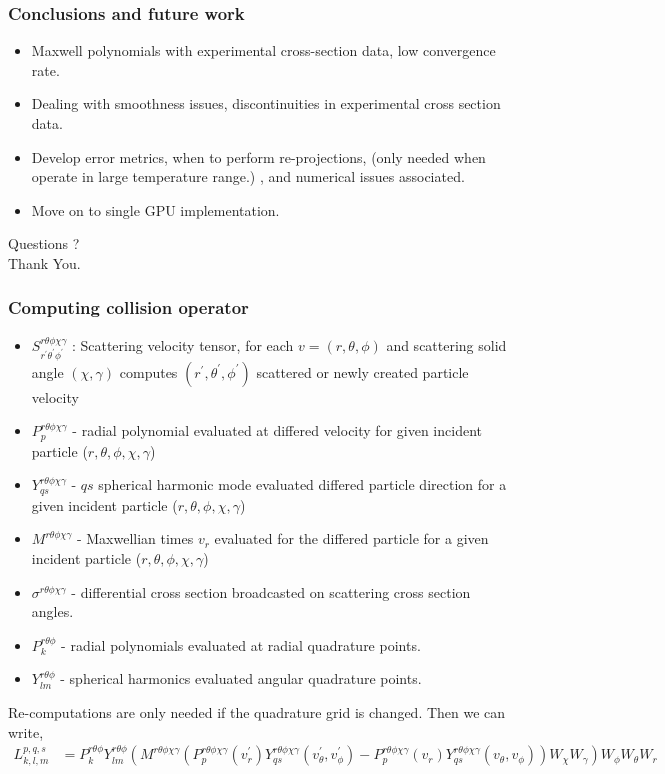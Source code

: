 \documentclass[mathserif, aspectratio=169]{beamer}
\begin{document}
	\begin{frame}
		\frametitle{Conclusions and future work}
		\begin{itemize}
			\item Maxwell polynomials with experimental cross-section data, low convergence rate. 
			\item Dealing with smoothness issues, discontinuities in experimental cross section data. 
			\item Develop error metrics, when to perform re-projections, (only needed when operate in large temperature range.) , and numerical issues associated.
			\item Move on to single GPU implementation.
		\end{itemize}
		\pause
		\begin{center}
			\Large Questions ? \\
			\Large Thank You. 
		\end{center}
	\end{frame}

	\begin{frame}
		\frametitle{Computing collision operator}
		\begin{itemize}
			\item $S^{r\theta\phi\chi\gamma}_{r^\prime\theta^\prime \phi^\prime}$ : Scattering velocity tensor, for each $v=(r,\theta,\phi)$ and scattering solid angle $(\chi,\gamma)$ computes $(r^\prime,\theta^\prime,\phi^\prime)$ scattered or newly created particle velocity
			\item $P^{r\theta\phi\chi\gamma}_{p}$ - radial polynomial evaluated at differed velocity for given incident particle ($r,\theta,\phi,\chi,\gamma$)
			\item $Y^{r\theta\phi\chi\gamma}_{qs}$ - $qs$ spherical harmonic mode evaluated differed particle direction for a given incident particle ($r,\theta,\phi,\chi,\gamma$)
			\item $M^{r\theta\phi\chi\gamma}$ - Maxwellian times $v_r$ evaluated for the differed particle for a given incident particle ($r,\theta,\phi,\chi,\gamma$)
			\item $\sigma^{r\theta\phi\chi\gamma}$ - differential cross section broadcasted on scattering cross section angles. 
			\item $P^{r\theta\phi}_{k}$ - radial polynomials evaluated at radial quadrature points. 
			\item $Y_{lm}^{r\theta\phi}$ - spherical harmonics evaluated angular quadrature points. 
		\end{itemize}
		Re-computations are only needed if the quadrature grid is changed. Then we can write, 
		\tiny
		{
			\begin{align*}
				{L}_{k,l,m}^{p,q,s} &=P^{r\theta\phi}_{k} Y_{lm}^{r\theta\phi} \left( M^{r\theta\phi\chi\gamma} \left(P^{r\theta\phi\chi\gamma}_{p} (v^\prime_r)	Y^{r\theta\phi\chi\gamma}_{qs} (v^\prime_\theta,v^{\prime}_\phi) - P^{r\theta\phi\chi\gamma}_{p} (v_r)	Y^{r\theta\phi\chi\gamma}_{qs} (v_\theta,v_\phi) \right) W_\chi W_\gamma \right) W_\phi W_\theta W_r
			\end{align*}
		}%
	\end{frame}
\end{document}
